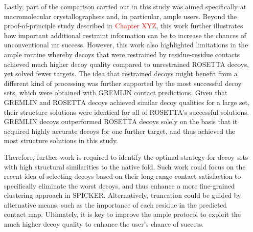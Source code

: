 Lastly, part of the comparison carried out in this study was aimed specifically at macromolecular crystallographers and, in particular, \gls{ample} users. Beyond the proof-of-principle study described in \textcolor{red}{Chapter XYZ}, this work further illustrates how important additional restraint information can be to increase the chances of unconventional \gls{mr} success. However, this work also highlighted limitations in the \gls{ample} routine whereby decoys that were restrained by residue-residue contacts achieved much higher decoy quality compared to unrestrained ROSETTA decoys, yet solved fewer targets. The idea that restrained decoys might benefit from a different kind of processing was further supported by the most successful decoy sets, which were obtained with GREMLIN contact predictions. Given that GREMLIN and ROSETTA decoys achieved similar decoy qualities for a large set, their structure solutions were identical for all of ROSETTA’s successful solutions. GREMLIN decoys outperformed ROSETTA decoys solely on the basis that it acquired highly accurate decoys for one further target, and thus achieved the most structure solutions in this study. 

Therefore, further work is required to identify the optimal strategy for decoy sets with high structural similarities to the native fold. Such work could focus on the recent idea of selecting decoys based on their long-range contact satisfaction \cite{De_Oliveira2017-yf, Ovchinnikov2017-nd} to specifically eliminate the worst decoys, and thus enhance a more fine-grained clustering approach in SPICKER. Alternatively, truncation could be guided by alternative means, such as the importance of each residue in the predicted contact map. Ultimately, it is key to improve the \gls{ample} protocol to exploit the much higher decoy quality to enhance the user’s chance of success.
